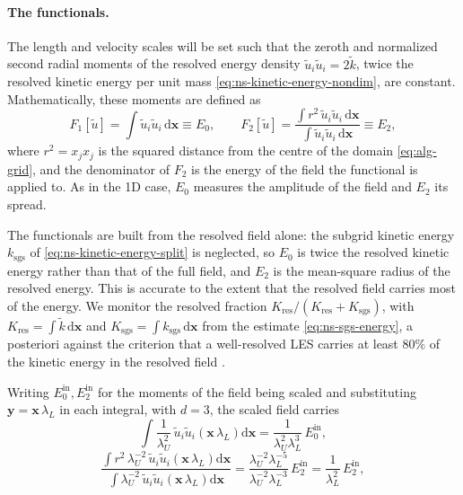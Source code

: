 \documentclass{article}
\begin{document}
\paragraph{The functionals.}
The length and velocity scales will be set such that the zeroth and normalized
second radial moments of the resolved energy density
$\tilde u_i \tilde u_i = 2 \tilde k$, twice the resolved kinetic energy per
unit mass \eqref{eq:ns-kinetic-energy-nondim}, are constant. Mathematically,
these moments are defined as
\begin{equation}\label{eq:ns-functionals}
  F_1[\tilde u] = \int \tilde u_i \tilde u_i\, \mathrm{d}\mathbf{x} \equiv E_0,
  \qquad
  F_2[\tilde u] = \frac{\int r^2\, \tilde u_i \tilde u_i\, \mathrm{d}\mathbf{x}}{\int \tilde u_i \tilde u_i\, \mathrm{d}\mathbf{x}} \equiv E_2,
\end{equation}
where $r^2 = x_j x_j$ is the squared distance from the centre of the domain
\eqref{eq:alg-grid}, and the denominator of $F_2$ is the energy of the field
the functional is applied to. As in the 1D case, $E_0$ measures the
amplitude of the field and $E_2$ its spread.
\par
The functionals are built from the resolved field alone: the subgrid kinetic
energy $k_{\mathrm{sgs}}$ of \eqref{eq:ns-kinetic-energy-split} is neglected,
so $E_0$ is twice the resolved kinetic energy rather than that of the full
field, and $E_2$ is the mean-square radius of the resolved energy. This is
accurate to the extent that the resolved field carries most of the energy. We
monitor the resolved fraction
$K_{\mathrm{res}} / (K_{\mathrm{res}} + K_{\mathrm{sgs}})$, with
$K_{\mathrm{res}} = \int \tilde k\, \mathrm{d}\mathbf{x}$ and
$K_{\mathrm{sgs}} = \int k_{\mathrm{sgs}}\, \mathrm{d}\mathbf{x}$ from the
estimate \eqref{eq:ns-sgs-energy}, a posteriori against the criterion that a
well-resolved LES carries at least $80\%$ of the kinetic energy in the
resolved field \cite{pope2000turbulent}.
\par
Writing $E_0^{\mathrm{in}}, E_2^{\mathrm{in}}$ for the moments of the field
being scaled and substituting $\mathbf{y} = \mathbf{x}\, \lambda_L$ in each
integral, with $d = 3$, the scaled field carries
\begin{equation}\label{eq:ns-e0-homogeneity}
  \int \frac{1}{\lambda_U^2}\, \tilde u_i \tilde u_i\!\left( \mathbf{x}\, \lambda_L \right) \mathrm{d}\mathbf{x}
  = \frac{1}{\lambda_U^2 \lambda_L^{3}}\, E_0^{\mathrm{in}},
\end{equation}
\begin{equation}\label{eq:ns-e2-homogeneity}
  \frac{\int r^2\, \lambda_U^{-2}\, \tilde u_i \tilde u_i\!\left( \mathbf{x}\, \lambda_L \right) \mathrm{d}\mathbf{x}}
       {\int \lambda_U^{-2}\, \tilde u_i \tilde u_i\!\left( \mathbf{x}\, \lambda_L \right) \mathrm{d}\mathbf{x}}
  = \frac{\lambda_U^{-2} \lambda_L^{-5}}{\lambda_U^{-2} \lambda_L^{-3}}\, E_2^{\mathrm{in}}
  = \frac{1}{\lambda_L^{2}}\, E_2^{\mathrm{in}},
\end{equation}
\end{document}
